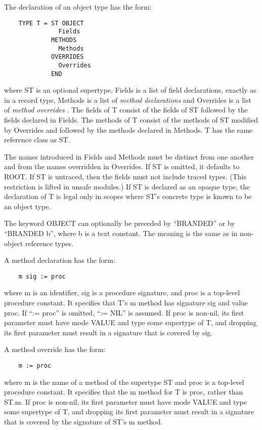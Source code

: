 \documentclass[10pt]{article}
\begin{document}
The declaration of an object type has the form:
\begin{verbatim}
    TYPE T = ST OBJECT
               Fields
             METHODS
               Methods
             OVERRIDES
               Overrides
             END
\end{verbatim}
where ST is an optional supertype, Fields is a list of field declarations,
exactly as in a record type, Methods is a list of \emph{method declarations}
and Overrides is a list of \emph{method overrides} .  The fields of T consist
of the fields of ST followed by the fields declared in Fields.  The methods of
T consist of the methods of ST modified by Overrides and followed by the
methods declared in Methods.  T has the same reference class as ST.

The names introduced in Fields and Methods must be distinct from one another
and from the names overridden in Overrides.  If ST is omitted, it defaults to
ROOT.  If ST is untraced, then the fields must not include traced types.  (This
restriction is lifted in unsafe modules.) If ST is declared as an opaque type,
the declaration of T is legal only in scopes where ST's concrete type is known
to be an object type.

The keyword OBJECT can optionally be preceded by ``BRANDED'' or by ``BRANDED
b'', where b is a text constant.  The meaning is the same as in non-object
reference types.

A method declaration has the form:
\begin{verbatim}
    m sig := proc
\end{verbatim}
where m is an identifier, sig is a procedure signature, and proc is a
top-level procedure constant.  It specifies that T's m method has signature sig
and value proc.  If ``:= proc'' is omitted, ``:= NIL'' is assumed.  If proc is
non-nil, its first parameter must have mode VALUE and type some supertype of
T, and dropping its first parameter must result in a signature that is covered
by sig.

A method override has the form:
\begin{verbatim}
    m := proc
\end{verbatim}
where m is the name of a method of the supertype ST and proc is a top-level
procedure constant.  It specifies that the m method for T is proc, rather than
ST.m.  If proc is non-nil, its first parameter must have mode VALUE and type
some supertype of T, and dropping its first parameter must result in a
signature that is covered by the signature of ST's m method.
\end{document}
